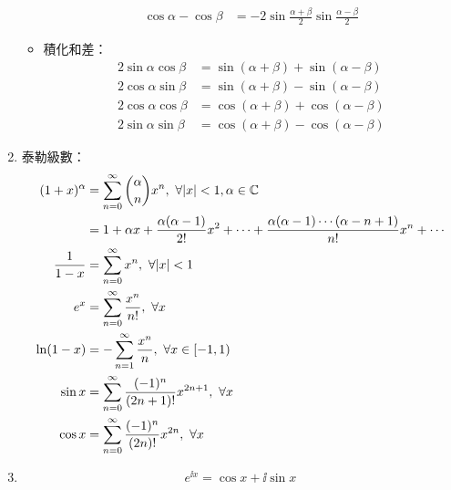 \begin{enumerate}
\begin{itemize}
\begin{subequations}
\begin{align}
                \cos\alpha - \cos\beta & = -2\sin\frac{\alpha + \beta}{2}\sin\frac{\alpha - \beta}{2}
            \end{align}
        \end{subequations}
        \item 積化和差： \begin{subequations}
            \begin{align}
                2\sin\alpha\cos\beta & = \sin(\alpha + \beta) + \sin(\alpha - \beta) \\
                2\cos\alpha\sin\beta & = \sin(\alpha + \beta) - \sin(\alpha - \beta) \\
                2\cos\alpha\cos\beta & = \cos(\alpha + \beta) + \cos(\alpha - \beta) \\
                2\sin\alpha\sin\beta & = \cos(\alpha + \beta) - \cos(\alpha - \beta)
            \end{align}
        \end{subequations}
    \end{itemize}
    \item 泰勒級數：\begin{subequations}
        \begin{align}
            (1 + x)^{\alpha} & = \sum_{n = 0}^{\infty}\binom{\alpha}{n}x^n, \ \forall |x| < 1, \alpha \in \C \\
            & = 1 + \alpha x + \frac{\alpha(\alpha - 1)}{2!}x^2 + \cdots + \frac{\alpha(\alpha - 1)\cdots(\alpha - n + 1)}{n!}x^n + \cdots \\
            \frac{1}{1 - x} & = \sum_{n = 0}^{\infty}x^n, \ \forall |x| < 1 \\
            e^x & = \sum_{n = 0}^{\infty}\frac{x^n}{n!}, \ \forall x \\
            \ln(1 - x) & = -\sum_{n = 1}^{\infty}\frac{x^n}{n}, \ \forall x \in [-1, 1) \\
            \sin x & = \sum_{n = 0}^{\infty}\frac{(-1)^n}{(2n + 1)!}x^{2n + 1}, \ \forall x \\
            \cos x & = \sum_{n = 0}^{\infty}\frac{(-1)^n}{(2n)!}x^{2n}, \ \forall x
        \end{align}
    \end{subequations}
    \item \begin{equation}
        e^{\ii x} = \cos x + \ii\sin x
    \end{equation}
\end{enumerate}

\pagebreak